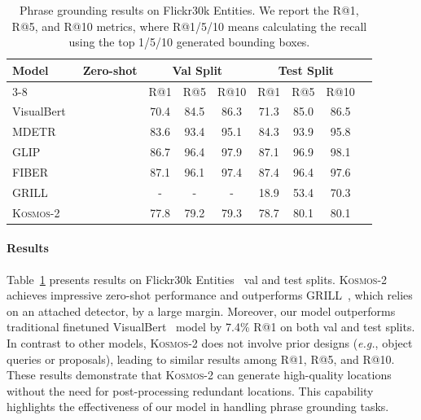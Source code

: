 \documentclass{article}
\newcommand\our{\textsc{Kosmos-2}}
\newcommand{\cmark}{{\color{blue}\ding{51}}}%
\newcommand{\xmark}{{\color{black}\ding{55}}}%
\newcommand\eg{\textit{e.g.}}
\begin{document}
\begin{table}[t]
\centering
\begin{tabular}{lcccccccc}
\toprule
\multirow{2}{*}{\textbf{Model}} & \multirow{2}{*}{\textbf{Zero-shot}} & \multicolumn{3}{c|}{\textbf{Val Split}} & \multicolumn{3}{c}{\textbf{Test Split}} \\ \cmidrule(l){3-8} 
 & & R@1 & R@5 & R@10 & R@1 & R@5 & R@10 \\ \midrule
VisualBert~\cite{visualbert} & \xmark & 70.4 & 84.5 & 86.3 & 71.3 & 85.0 & 86.5 \\
MDETR~\cite{mdetr} & \xmark & 83.6 & 93.4 & 95.1 & 84.3 & 93.9 & 95.8\\
GLIP~\cite{glip} & \xmark & 86.7 & 96.4 & 97.9 & 87.1 & 96.9 & 98.1 \\
FIBER~\cite{fiber} & \xmark & 87.1 & 96.1 & 97.4 & 87.4 & 96.4 & 97.6 \\
GRILL~\cite{Jin2023GRILLGV} & \cmark & - & - & - & 18.9 & 53.4 & 70.3 \\ \midrule
\our{} & \cmark & 77.8 & 79.2 & 79.3 & 78.7 & 80.1 & 80.1  \\
\bottomrule
\end{tabular}
\vspace{0.2cm}
\caption{Phrase grounding results on Flickr30k Entities.
We report the R@1, R@5, and R@10 metrics, where R@1/5/10 means calculating the recall using the top 1/5/10 generated bounding boxes. 
}
\vspace{-0.2cm}
\label{tbl:grd:flickr}
\end{table}

\paragraph{Results}
Table~\ref{tbl:grd:flickr} presents results on Flickr30k Entities~\cite{flickr_entity} val and test splits. 
\our{} achieves impressive zero-shot performance and outperforms GRILL~\cite{Jin2023GRILLGV}, which relies on an attached detector, by a large margin. 
Moreover, our model outperforms traditional finetuned  VisualBert~\cite{visualbert} model by 7.4\% R@1 on both val and test splits.
In contrast to other models, \our{} does not involve prior designs (\eg, object queries or proposals), leading to similar results among R@1, R@5, and R@10.
These results demonstrate that \our{} can generate high-quality locations without the need for post-processing redundant locations. 
This capability highlights the effectiveness of our model in handling phrase grounding tasks.
\end{document}
